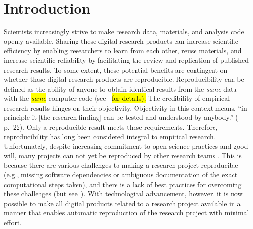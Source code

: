 \documentclass[psych,tutorial,accept,moreauthors,pdftex]{Definitions/mdpi}
\begin{document}


\section{Introduction}\label{introduction}

Scientists increasingly strive to make research data, materials, and
analysis code openly available. Sharing these digital research products
can increase scientific efficiency by enabling researchers to learn from
each other, reuse materials, and increase scientific reliability by
facilitating the review and replication of published research results.
To some extent, these potential benefits are contingent on whether these
digital research products are reproducible. Reproducibility can be
defined as the ability of anyone to obtain identical results from the
\emph{same} data with the \hl{\emph{same}} %
 computer code (see~\citep{Peikert2019} \hl{for
details).} %
 The credibility of empirical research results
hinges on their objectivity. Objectivity in this context means, ``in
principle it {[}the research finding{]} can be tested and understood by
anybody.'' (\citep{popperLogicScientificDiscovery2002} p.~22). Only a
reproducible result meets these requirements. Therefore, reproducibility
has long been considered integral to empirical research. Unfortunately,
despite increasing commitment to open science practices and good will,
many projects can not yet be reproduced by other research teams
\citep{obels2020}. This is because there are various challenges to
making a research project reproducible (e.g., missing software
dependencies or ambiguous documentation of the exact computational steps
taken), and there is a lack of best practices for overcoming these
challenges (but see~\citep{vanlissa2020worcs}). With technological
advancement, however, it is now possible to make all digital products
related to a research project available in a manner that enables
automatic reproduction of the research project with minimal effort.
\end{document}
